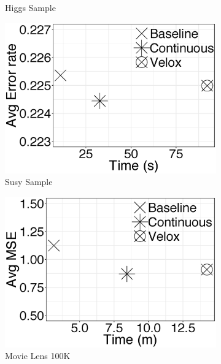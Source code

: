 \documentclass{vldb}
\begin{document}
\begin{figure}[h]
\begin{subfigure}{0.33\textwidth}
  \caption{Higgs Sample}
\end{subfigure}%
\begin{subfigure}{0.33\textwidth}
 \centering
  \includegraphics[width=1\linewidth, height=1\linewidth, keepaspectratio]{../images/experiment-results/susy-sample-meta-performance.eps}
  \caption{Susy Sample}
\end{subfigure}
\centering
\begin{subfigure}{.30\textwidth}
 
  \includegraphics[width=1\linewidth, height=1\linewidth, keepaspectratio]{../images/experiment-results/movie-lens-100k-meta-performance.eps}
  \caption{Movie Lens 100K}
  \label{fig:sfig2}
\end{subfigure}%
\begin{subfigure}{0.30\textwidth}


\end{subfigure}
\end{figure}
\end{document}
